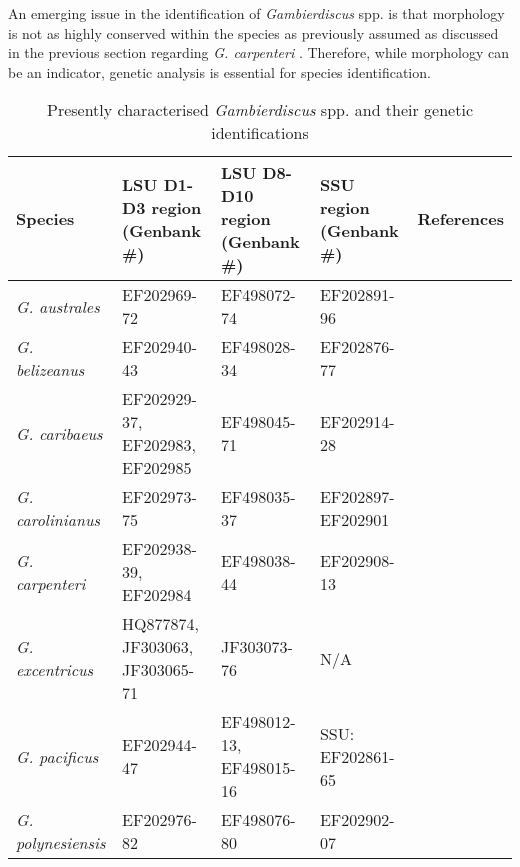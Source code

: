 \documentclass[12pt]{article}
\begin{document}
An emerging issue in the identification of \emph{Gambierdiscus} spp. is that morphology is not as highly conserved within the species as previously assumed as discussed in the previous section regarding \emph{G. carpenteri} \cite{kohli2014high}. Therefore, while morphology can be an indicator, genetic analysis is essential for species identification.

\FloatBarrier
\begin{longtable}{ |  p{2.2cm} | p{2.8cm} | p{2.8cm} | p{2.8cm} | p{2.6cm} | }
\caption{Presently characterised \emph{Gambierdiscus} spp. and their genetic identifications}\\
\hline
\label{tbl:PhyloTable}
\textbf{Species} & \textbf{LSU D1-D3 region (Genbank \#)} & \textbf{LSU D8-D10 region (Genbank \#)} & \textbf{SSU region (Genbank \#)} & \textbf{References} \\
\hline
 \emph{G. australes} & EF202969-72 & EF498072-74  & EF202891-96 & \cite{chinain1999morphology,litaker2009taxonomy} \\
\hline
 \emph{G. belizeanus} & EF202940-43 &  EF498028-34 & EF202876-77  & \cite{litaker2009taxonomy,faust1995observation} \\
\hline
 \emph{G. caribaeus} & EF202929-37, EF202983, EF202985 &  EF498045-71  & EF202914-28 & \cite{litaker2009taxonomy} \\
\hline
 \emph{G. carolinianus} &  EF202973-75 & EF498035-37 & EF202897-EF202901  & \cite{litaker2009taxonomy} \\
\hline
 \emph{G. carpenteri} &  EF202938-39, EF202984 & EF498038-44  & EF202908-13   & \cite{litaker2009taxonomy} \\
\hline
  \emph{G. excentricus} &  HQ877874, JF303063, JF303065-71 & JF303073-76 & N/A & \cite{litaker2009taxonomy} \\
\hline
  \emph{G. pacificus} &  EF202944-47 &  EF498012-13, EF498015-16 & SSU: EF202861-65  & \cite{litaker2009taxonomy,chinain1999morphology} \\
\hline
 \emph{G. polynesiensis} &  EF202976-82 & EF498076-80 & EF202902-07& \cite{litaker2009taxonomy,chinain1999morphology} \\

\end{longtable}
\end{document}
